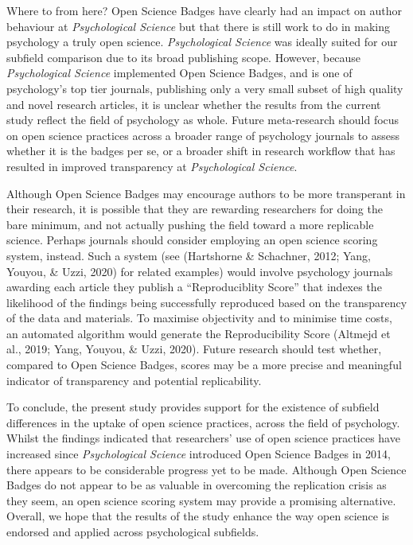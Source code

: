 \documentclass[
  english,
  man,floatsintext]{apa6}
\begin{document}
Where to from here? Open Science Badges have clearly had an impact on author behaviour at \emph{Psychological Science} but that there is still work to do in making psychology a truly open science. \emph{Psychological Science} was ideally suited for our subfield comparison due to its broad publishing scope. However, because \emph{Psychological Science} implemented Open Science Badges, and is one of psychology's top tier journals, publishing only a very small subset of high quality and novel research articles, it is unclear whether the results from the current study reflect the field of psychology as whole. Future meta-research should focus on open science practices across a broader range of psychology journals to assess whether it is the badges per se, or a broader shift in research workflow that has resulted in improved transparency at \emph{Psychological Science}.

Although Open Science Badges may encourage authors to be more transperant in their research, it is possible that they are rewarding researchers for doing the bare minimum, and not actually pushing the field toward a more replicable science. Perhaps journals should consider employing an open science scoring system, instead. Such a system (see (Hartshorne \& Schachner, 2012; Yang, Youyou, \& Uzzi, 2020) for related examples) would involve psychology journals awarding each article they publish a ``Reproduciblity Score'' that indexes the likelihood of the findings being successfully reproduced based on the transparency of the data and materials. To maximise objectivity and to minimise time costs, an automated algorithm would generate the Reproducibility Score (Altmejd et al., 2019; Yang, Youyou, \& Uzzi, 2020). Future research should test whether, compared to Open Science Badges, scores may be a more precise and meaningful indicator of transparency and potential replicability.

To conclude, the present study provides support for the existence of subfield differences in the uptake of open science practices, across the field of psychology. Whilst the findings indicated that researchers' use of open science practices have increased since \emph{Psychological Science} introduced Open Science Badges in 2014, there appears to be considerable progress yet to be made. Although Open Science Badges do not appear to be as valuable in overcoming the replication crisis as they seem, an open science scoring system may provide a promising alternative. Overall, we hope that the results of the study enhance the way open science is endorsed and applied across psychological subfields.
\end{document}
